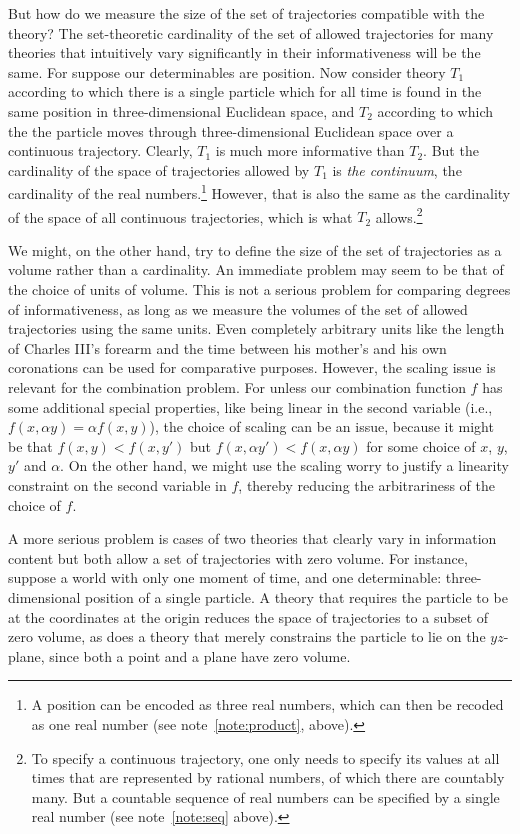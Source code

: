 But how do we measure the size of the set of trajectories compatible with the theory? The set-theoretic cardinality of the set of allowed
trajectories for many theories that intuitively vary significantly in their informativeness will be the same. For suppose our determinables
are position. Now consider theory $T_1$ according to which there is a single particle which for all time is found in the same position
in three-dimensional Euclidean space, and $T_2$ according to which the the particle moves through three-dimensional Euclidean space over
a continuous trajectory. Clearly, $T_1$ is much more informative than $T_2$. But the cardinality of the space of trajectories allowed by
$T_1$ is \textit{the continuum}, the cardinality of the real numbers.\footnote{A position can be encoded as three real numbers, which can then be recoded as one real number (see note~\ref{note:product}, above).} However, that is also
the same as the cardinality of the space of all continuous trajectories, which is what $T_2$ allows.\footnote{To specify a continuous
trajectory, one only needs to specify its values at all times that are represented by rational 
numbers, of which there are countably many. But a countable sequence of real numbers can be specified by a 
single real number (see note~\ref{note:seq} above).}

We might, on the other hand, try to define the size of the set of trajectories as a volume rather than a cardinality. 
An immediate problem may seem to be that of the choice of units of volume. This is not a serious problem for comparing
degrees of informativeness,  as long as we measure the volumes of the set of allowed trajectories using the 
same units. Even completely arbitrary units like the length of Charles III's forearm and the time between his mother's
and his own coronations can be used for comparative purposes. However, the scaling issue is relevant for the combination
problem. For unless our combination function $f$ has some additional special properties, like being linear in the second variable
(i.e., $f(x,\alpha y)=\alpha f(x,y)$), the choice of scaling can be an issue, because it might be that $f(x,y)<f(x,y')$ but 
$f(x,\alpha y')<f(x,\alpha y)$ for some choice of $x$, $y$, $y'$ and $\alpha$. On the other hand, we might use the scaling worry
to justify a linearity constraint on the second variable in $f$, thereby reducing the arbitrariness of the choice of $f$.

A more serious problem is 
cases of two theories that clearly vary in information content but both allow a set of trajectories with zero volume. For instance, 
suppose a world with only one moment of time, and one determinable: three-dimensional position of a single
particle. A theory that requires the particle to be at the coordinates at the origin reduces the space of trajectories to a subset of zero
volume, as does a theory that merely constrains the particle to lie on the $yz$-plane, since both a point and a plane  have zero volume. 


